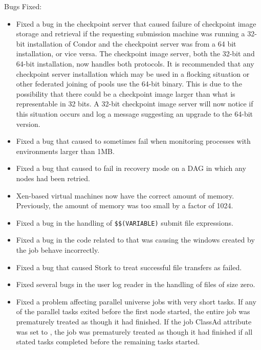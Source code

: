 \noindent Bugs Fixed:

\begin{itemize}

\item Fixed a bug in the checkpoint server that caused failure of
checkpoint image storage and retrieval if the requesting submission
machine was running a 32-bit installation of Condor and the checkpoint
server was from a 64 bit installation, or vice versa. The checkpoint
image server, both the 32-bit and 64-bit installation, now handles both
protocols. It is recommended that any checkpoint server installation which
may be used in a flocking situation or other federated joining of pools
use the 64-bit binary. This is due to the possibility that there could be
a checkpoint image larger than what is representable in 32 bits. A 32-bit
checkpoint image server will now notice if this situation occurs and log
a message suggesting an upgrade to the 64-bit version.

\item Fixed a bug that caused  to sometimes fail when monitoring
processes with environments larger than 1MB.

\item Fixed a bug that caused  to fail in recovery mode on
a DAG in which any nodes had been retried.

\item Xen-based virtual machines now have the correct amount of memory.
Previously, the amount of memory was too small by a factor of 1024.

\item Fixed a bug in the handling of \texttt{\$\$(VARIABLE)} submit
  file expressions.

\item Fixed a bug in the code related to  
  that was causing the windows created by the job behave incorrectly.

\item Fixed a bug that caused Stork to treat successful file transfers
as failed.

\item Fixed several bugs in the user log reader in the handling of
  files of size zero.

\item Fixed a problem affecting parallel universe jobs with very short
tasks.  If any of the parallel tasks exited before the first node
started, the entire job was prematurely treated as though it had
finished.  If the job ClassAd attribute  was
set to , the job was prematurely treated as though it
had finished if all stated tasks completed before the remaining tasks
started.

\end{itemize}

